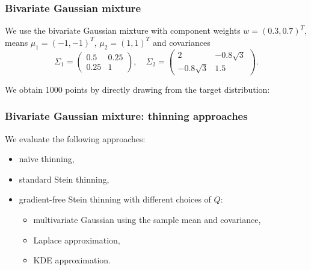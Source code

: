 \documentclass{beamer}
\begin{document}
\begin{frame}
\frametitle{Bivariate Gaussian mixture}

We use the bivariate Gaussian mixture with component weights $w = (0.3, 0.7)^T$, means $\mu_1=(-1, -1)^T$, $\mu_2 = (1, 1)^T$ and covariances
$$
\Sigma_1 = \begin{pmatrix}
0.5 & 0.25\\
0.25 & 1
\end{pmatrix}, \quad
\Sigma_2 = \begin{pmatrix}
2 & -0.8 \sqrt{3}\\
-0.8 \sqrt{3} & 1.5
\end{pmatrix}.
$$

We obtain 1000 points by directly drawing from the target distribution:

\begin{figure}[H]
\centering
{}
\end{figure}

\end{frame}



\begin{frame}
\frametitle{Bivariate Gaussian mixture: thinning approaches}

We evaluate the following approaches:
\begin{itemize}
\item na\"ive thinning,
\item standard Stein thinning,
\item gradient-free Stein thinning with different choices of $Q$:
	\begin{itemize}
	\item multivariate Gaussian using the sample mean and covariance,
	\item Laplace approximation,
	\item KDE approximation.
	\end{itemize}
\end{itemize}

\end{frame}
\end{document}

